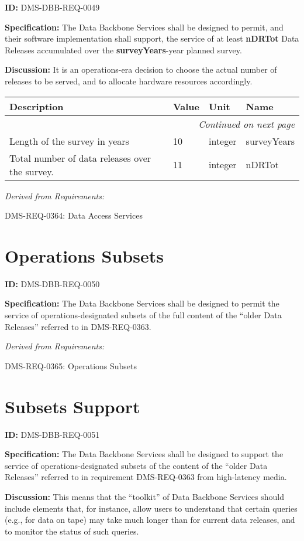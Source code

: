 \documentclass[SE,toc,lsstdraft]{lsstdoc}
\makeatletter
\newcommand{\paramname}[1]{\hspace{0pt}#1}
\newcommand{\unitname}[1]{\hspace{0pt}#1}
\newenvironment{parameters}[0]{%
\setlength\LTleft{0pt}
\setlength\LTright{\fill}
\begin{small}
\begin{longtable}[]{|p{0.49\textwidth}|l|p{0.6in}|p{1.70in}@{}|}

\hline \textbf{Description} & \textbf{Value} & \textbf{Unit} & \textbf{Name} \\ \hline
\endhead

\hline \multicolumn{4}{r}{\emph{Continued on next page}} \\
\endfoot

\hline\hline
\endlastfoot
}{%
\hline
\end{longtable}
\end{small}
}
\makeatother
\begin{document}
\label{DMS-DBB-REQ-0049}
\textbf{ID:} DMS-DBB-REQ-0049

\textbf{Specification:}
The Data Backbone Services shall be designed to permit, and their software implementation shall support, the service of at least \textbf{nDRTot} Data Releases accumulated over the \textbf{surveyYears}-year planned survey.

\textbf{Discussion:}
It is an operations-era decision to choose the actual number of releases to be served, and to allocate hardware resources accordingly.

\begin{parameters}
Length of the survey in years
&
10
&
\unitname{%
integer
}
&
\paramname{%
surveyYears
} \\\hline
Total number of data releases over the survey.
&
11
&
\unitname{%
integer
}
&
\paramname{%
nDRTot
} \\\hline
\end{parameters}

\emph{Derived from Requirements:}

DMS-REQ-0364:
Data Access Services \newline

\section{Operations Subsets}

\label{DMS-DBB-REQ-0050}
\textbf{ID:} DMS-DBB-REQ-0050

\textbf{Specification:}
The Data Backbone Services shall be designed to permit the service of operations-designated subsets of the full content of the “older Data Releases” referred to in DMS-REQ-0363.

\emph{Derived from Requirements:}

DMS-REQ-0365:
Operations Subsets \newline

\section{Subsets Support}

\label{DMS-DBB-REQ-0051}
\textbf{ID:} DMS-DBB-REQ-0051

\textbf{Specification:}
The Data Backbone Services shall be designed to support the service of operations-designated subsets of the content of the “older Data Releases” referred to in requirement DMS-REQ-0363 from high-latency media.

\textbf{Discussion:}
This means that the “toolkit” of Data Backbone Services should include elements that, for instance, allow users to understand that certain queries (e.g., for data on tape) may take much longer than for current data releases, and to monitor the status of such queries.
\end{document}
